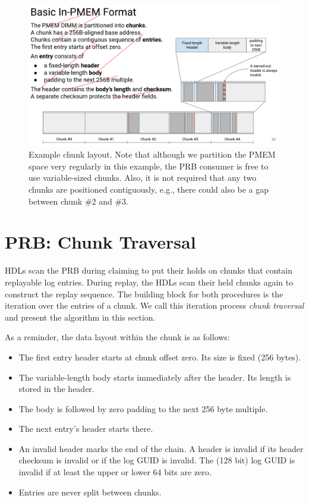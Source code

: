 \documentclass[12pt,a4paper,twoside]{book}
\begin{document}
{\begin{figure}[H]
    \centering
    \includegraphics{fig/prb_persistent_structure__chunklayout}
    \caption{Example chunk layout. Note that although we partition the PMEM space very regularly in this example, the PRB consumer is free to use variable-sized chunks.
        Also, it is not required that any two chunks are positioned contiguously, e.g., there could also be a gap between chunk \#2 and \#3.}
    \label{fig:prb_physical_data_structure__chunklayout}
\end{figure}


\section{PRB: Chunk Traversal}\label{di:prb:traversal}
HDLs scan the PRB during claiming to put their holds on chunks that contain replayable log entries.
During replay, the HDLs scan their held chunks again to construct the replay sequence.
The building block for both procedures is the iteration over the entries of a chunk.
We call this iteration process \textit{chunk traversal} and present the algorithm in this section.

As a reminder, the data layout within the chunk is as follows:
\begin{itemize}[noitemsep]
    \item The first entry header starts at chunk offset zero. Its size is fixed (256 bytes).
    \item The variable-length body starts immediately after the header. Its length is stored in the header.
    \item The body is followed by zero padding to the next 256 byte multiple.
    \item The next entry's header starts there.
    \item An invalid header marks the end of the chain.
        A header is invalid if its header checksum is invalid or if the log GUID is invalid.
        The (128 bit) log GUID is invalid if at least the upper or lower 64 bits are zero.
    \item Entries are never split between chunks.
\end{itemize}

}
\end{document}
